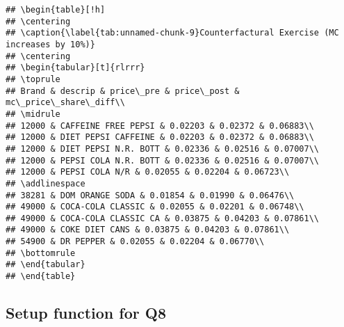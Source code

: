 \documentclass[
]{article}
\begin{document}
\begin{verbatim}
## \begin{table}[!h]
## \centering
## \caption{\label{tab:unnamed-chunk-9}Counterfactural Exercise (MC increases by 10%)}
## \centering
## \begin{tabular}[t]{rlrrr}
## \toprule
## Brand & descrip & price\_pre & price\_post & mc\_price\_share\_diff\\
## \midrule
## 12000 & CAFFEINE FREE PEPSI & 0.02203 & 0.02372 & 0.06883\\
## 12000 & DIET PEPSI CAFFEINE & 0.02203 & 0.02372 & 0.06883\\
## 12000 & DIET PEPSI N.R. BOTT & 0.02336 & 0.02516 & 0.07007\\
## 12000 & PEPSI COLA N.R. BOTT & 0.02336 & 0.02516 & 0.07007\\
## 12000 & PEPSI COLA N/R & 0.02055 & 0.02204 & 0.06723\\
## \addlinespace
## 38281 & DOM ORANGE SODA & 0.01854 & 0.01990 & 0.06476\\
## 49000 & COCA-COLA CLASSIC & 0.02055 & 0.02201 & 0.06748\\
## 49000 & COCA-COLA CLASSIC CA & 0.03875 & 0.04203 & 0.07861\\
## 49000 & COKE DIET CANS & 0.03875 & 0.04203 & 0.07861\\
## 54900 & DR PEPPER & 0.02055 & 0.02204 & 0.06770\\
## \bottomrule
## \end{tabular}
## \end{table}
\end{verbatim}

\hypertarget{setup-function-for-q8}{%
\subsection{Setup function for Q8}\label{setup-function-for-q8}}
\end{document}

